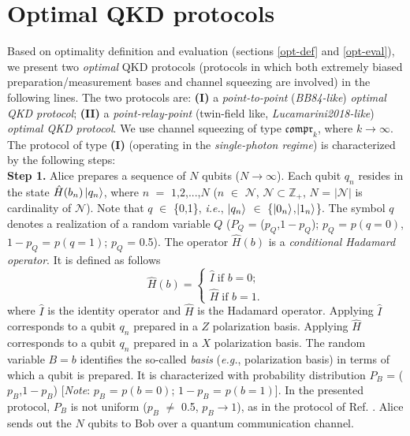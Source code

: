 \documentclass[journal,onecolumn]{IEEEtran}
\theoremstyle{thmstyleone}%
\theoremstyle{thmstyletwo}%
\theoremstyle{thmstylethree}%
\begin{document}
	
	
	\section{Optimal QKD protocols}\label{protocols}
	Based on optimality definition and evaluation (sections \ref{opt-def} and \ref{opt-eval}), we present two \textit{optimal} QKD protocols (protocols in which both extremely biased preparation/measurement bases \cite{Lo2005} and channel squeezing are involved) in the following lines. The two protocols are: \textbf{(I)} a \textit{point-to-point} (\textit{BB84-like}) \cite{Bennett1984,Lo2005} \textit{optimal QKD protocol}; \textbf{(II)} a \textit{point-relay-point} (twin-field like, \textit{Lucamarini2018-like}) \cite{Lucamarini2018,Curty2019} \textit{optimal QKD protocol}. We use channel squeezing of type $\mathfrak{compr}_k$, where $k\rightarrow\infty$. \\
	\indent The protocol of type \textbf{(I)} (operating in the \textit{single-photon regime}) is characterized by the following steps: \\
	\textbf{Step 1.} Alice prepares a sequence of $N$ qubits ($N\rightarrow\infty$). Each qubit $q_n$ resides in the state $\hat{H}(b_n)\ket{q_n}$, where $n$ $=$ $1$,$2$,$...$,$N$ ($n$ $\in$ $\mathcal{N}$, $\mathcal{N} \subset \mathbb{Z}_+$, $N$ = $|\mathcal{N}|$ is cardinality of $\mathcal{N}$). Note that $q$ $\in$ \{0,1\}, \textit{i.e.}, $\ket{q_n}$ $\in$ \{$\ket{\text{0}_n}$,$\ket{\text{1}_n}$\}. The symbol $q$ denotes a realization of a random variable $Q$ ($P_Q$ = ($p_{Q}$,$\text{1}-p_{Q}$); $p_Q$ = $p(q=\text{0})$, $\text{1}-p_Q$ = $p(q=\text{1})$; $p_Q$ = 0.5). The operator $\hat{H}(b)$ is a \textit{conditional Hadamard operator}. It is defined as follows
	\begin{equation}
		\hat{H}(b) = \begin{cases}
			\hat{I} \; \text{if $b = 0$;}\\
			\hat{H} \; \text{if $b = \text{1}$.}
		\end{cases}
	\end{equation}
	where $\hat{I}$ is the identity operator and $\hat{H}$ is the Hadamard operator. Applying $\hat{I}$ corresponds to a qubit $q_n$ prepared in a $Z$ polarization basis. Applying $\hat{H}$ corresponds to a qubit $q_n$ prepared in a $X$ polarization basis. The random variable $B = b$ identifies the so-called \textit{basis} (\textit{e.g.}, polarization basis) in terms of which a qubit is prepared. It is characterized with probability distribution $P_B$ = ($p_B$,$\text{1}-p_B$) [\textit{Note}: $p_B$ = $p(b=\text{0})$; $\text{1}-p_B$ = $p(b=\text{1})$]. In the presented protocol, $P_B$ is not uniform ($p_B$ $\neq$ 0.5, $p_B\rightarrow1$), as in the protocol of Ref. \cite{Lo2005}. Alice sends out the $N$ qubits to Bob over a quantum communication channel. \\
\end{document}
